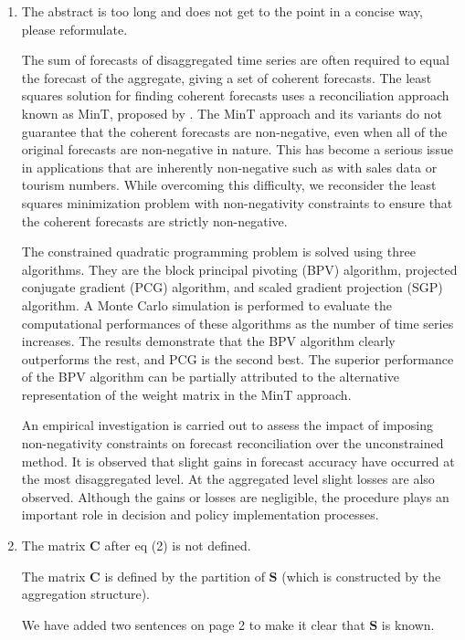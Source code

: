 \documentclass[10pt,a4paper]{article}
\begin{document}
\begin{enumerate}
\item
  The abstract is too long and does not get to the point in a concise way, please reformulate.

  {\color{blue}
  The sum of forecasts of disaggregated time series are often required to equal the forecast of the aggregate, giving a set of coherent forecasts. The least squares solution for finding coherent forecasts uses a reconciliation approach known as MinT, proposed by \citet{Wick2018}. The MinT approach and its variants do not guarantee that the coherent forecasts are non-negative, even when all of the original forecasts are non-negative in nature. This has become a serious issue in applications that are inherently non-negative such as with sales data or tourism numbers. While overcoming this difficulty, we reconsider the least squares minimization problem with non-negativity constraints to ensure that the coherent forecasts are strictly non-negative.

  The constrained quadratic programming problem is solved using three algorithms. They are the block principal pivoting (BPV) algorithm, projected conjugate gradient (PCG) algorithm, and scaled gradient projection (SGP) algorithm. A Monte Carlo simulation is performed to evaluate the computational performances of these algorithms as the number of time series increases. The results demonstrate that the BPV algorithm clearly outperforms the rest, and PCG is the second best. The superior performance of the BPV algorithm can be partially attributed to the alternative representation of the weight matrix in the MinT approach.

  An empirical investigation is carried out to assess the impact of imposing non-negativity constraints on forecast reconciliation over the unconstrained method. It is observed that slight gains in forecast accuracy have occurred at the most disaggregated level. At the aggregated level slight losses are also observed. Although the gains or losses are negligible, the procedure plays an important role in decision and policy implementation processes.}

\item
  The matrix $\bm{C}$ after eq (2) is not defined.

  {\color{blue}The matrix $\bm{C}$ is defined by the partition of $\bm{S}$ (which is constructed by the aggregation structure).
  
	We have added two sentences on page 2 to make it clear that $\bm{S}$ is known.}


\end{enumerate}
\end{document}
